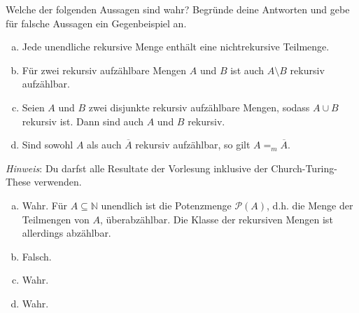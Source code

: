 \documentclass[german,headsepline]{scrartcl}
\theoremstyle{definition}
\begin{document}
	\begin{question}
		Welche der folgenden Aussagen sind wahr?
		Begründe deine Antworten und gebe für falsche Aussagen ein Gegenbeispiel an.
		\begin{enumerate}[(a)]
			\item Jede unendliche rekursive Menge enthält eine nichtrekursive Teilmenge.
			\item Für zwei rekursiv aufzählbare Mengen $A$ und $B$ ist auch $A\setminus B$ rekursiv aufzählbar.
			\item Seien $A$ und $B$ zwei disjunkte rekursiv aufzählbare Mengen, sodass $A\cup B$ rekursiv ist.
				Dann sind auch $A$ und $B$ rekursiv.
			\item Sind sowohl $A$ als auch $\overline{A}$ rekursiv aufzählbar, so gilt $A=_m\overline{A}$.
		\end{enumerate}
		\textit{Hinweis}: Du darfst alle Resultate der Vorlesung inklusive der Church-Turing-These verwenden.
	\end{question}
	\begin{solution}
		\begin{enumerate}[(a)]
			\item Wahr. Für $A\subseteq\mathbb{N}$ unendlich ist die Potenzmenge $\mathcal{P}(A)$,
				d.h. die Menge der Teilmengen von $A$, überabzählbar.
				Die Klasse der rekursiven Mengen ist allerdings abzählbar.
			\item Falsch.
			\item Wahr.
			\item Wahr.
		\end{enumerate}
	\end{solution}
	
\end{document}

